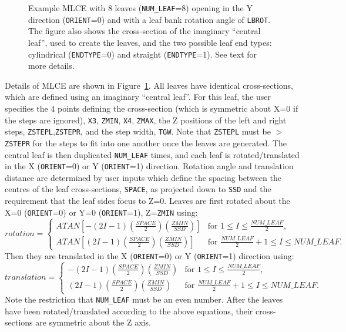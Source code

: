 \documentclass[12pt,twoside]{article}
\begin{document}
\begin{figure}[htpb]
\begin{center}
\begin{htmlonly}
\end{htmlonly}
\end{center}
\caption[MLCE CM geometry]
{Example MLCE with 8 leaves ({\tt NUM\_LEAF}=8) opening in the Y
direction ({\tt ORIENT}=0) and with a leaf bank rotation angle
of {\tt LBROT}.  The figure also shows the cross-section
of the imaginary ``central leaf'', used to create the leaves, and
the two possible leaf end types: cylindrical ({\tt ENDTYPE}=0) and
straight ({\tt ENDTYPE}=1).  See text for more details.}
\label{mlce_fig}
\end{figure}

Details of MLCE are shown in Figure~\ref{mlce_fig}.  All leaves have
identical cross-sections, which are defined using an imaginary
``central leaf''.  For this leaf,
the user specifies the 4 points defining the cross-section (which is symmetric
about X=0 if the steps are ignored),
{\tt X3}, {\tt ZMIN}, {\tt X4}, {\tt ZMAX}, the Z positions of the left and right
steps, {\tt ZSTEPL},{\tt ZSTEPR}, and the step width, {\tt TGW}.   Note that
{\tt ZSTEPL} must be $>${\tt ZSTEPR} for the steps to fit into one another
once the leaves are generated.  The central leaf is then duplicated
{\tt NUM\_LEAF} times, and each leaf is rotated/translated in the
X ({\tt ORIENT}=0) or Y ({\tt ORIENT}=1) direction.
Rotation angle and translation distance are determined by user
inputs which define the spacing between the
centres of the leaf cross-sections, {\tt SPACE},
as projected down to {\tt SSD} and the requirement that the leaf sides
focus to Z=0.   Leaves are first rotated about the X=0 ({\tt ORIENT}=0)
or Y=0 ({\tt ORIENT}=1), Z={\tt ZMIN} using:
\begin{equation}
rotation=
\begin{cases}
ATAN\left[-\left(2I-1\right)\left(\frac{SPACE}{2}\right)\left(\frac{ZMIN}{SSD}\right)\right] &
\text{for 1$\leq I\leq\frac{NUM\_LEAF}{2}$},\\
ATAN\left[\left(2I-1\right)\left(\frac{SPACE}{2}\right)\left(\frac{ZMIN}{SSD}\right)\right] &
\text{for $\frac{NUM\_LEAF}{2}+1\leq I\leq NUM\_LEAF$}.
\end{cases}
\end{equation}
Then they are translated in the X ({\tt ORIENT}=0) or Y
({\tt ORIENT}=1) direction using:
\begin{equation}
translation=
\begin{cases}
-\left(2I-1\right)\left(\frac{SPACE}{2}\right)\left(\frac{ZMIN}{SSD}\right) &
\text{for 1$\leq I\leq\frac{NUM\_LEAF}{2}$},\\
\left(2I-1\right)\left(\frac{SPACE}{2}\right)\left(\frac{ZMIN}{SSD}\right) &
\text{for $\frac{NUM\_LEAF}{2}+1\leq I\leq NUM\_LEAF$}.
\end{cases}
\end{equation}
Note the restriction that {\tt NUM\_LEAF} must be an even number.
After the leaves have been rotated/translated according to the above equations,
their cross-sections are symmetric about the Z axis.
\end{document}

